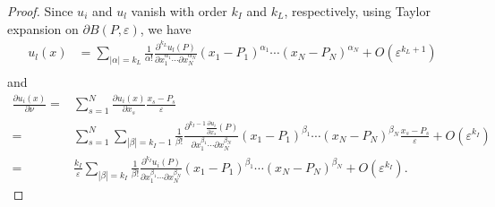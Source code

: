 \documentclass[11pt,reqno]{article}
\numberwithin{equation}{section}
\newcommand\e\varepsilon
\newcommand{\Ma}{\color{blue}}
\newcommand{\Ying}{\color{red}}
\begin{document}
\begin{proof}
        
        Since $u_i$ and $u_l$ vanish with order $k_I$ and $k_L$, respectively,
         using Taylor expansion on $\partial B(P,\e)$, we have
        \begin{equation}\label{eq27102025-1}
        \begin{aligned}
u_l(x)&=\sum_{|\alpha|={ k_L}}\frac1{\alpha!}\frac{\partial^{{ k_L}}u_l(P)}{\partial x_1^{\alpha_1}\cdots\partial x_N^{\alpha_N}}(x_1-P_1)^{\alpha_1}\cdots(x_N-P_N)^{\alpha_N}+O(\e^{{ k_L}+1})\\
       \end{aligned}
        \end{equation}
        and 
        \begin{equation}\label{eq27102025-2}
        \begin{aligned}
        \frac{\partial u_i (x)}{\partial \nu}=&\sum_{s=1}^N \frac{\partial u_i (x)}{\partial x_s}\frac{x_s-P_s}{\e}\\
        =&\sum_{s=1}^N\sum_{|\beta|={ k_I}-1}\frac1{\beta!}\frac{\partial^{{ k_I}-1}\frac{\partial u_i }{\partial x_s}(P)}{\partial x_1^{\beta_1}\cdots\partial x_N^{\beta_N}}(x_1-P_1)^{\beta_1}\cdots(x_N-P_N)^{\beta_N}\frac{x_s-P_s}{\e}+O(\e^{{ k_I}})\\
        =&\frac{ k_I}{\e}\sum_{|\beta|=k_I}\frac{1}{\beta!}\frac{\partial^{{ k_I}} u_i (P)}{\partial x_1^{\beta_1}\cdots\partial x_N^{\beta_N}}(x_1-P_1)^{\beta_1}\cdots(x_N-P_N)^{\beta_N}+O(\e^{{ k_I}}).
         \end{aligned}
        \end{equation}

\end{proof}
\end{document}
